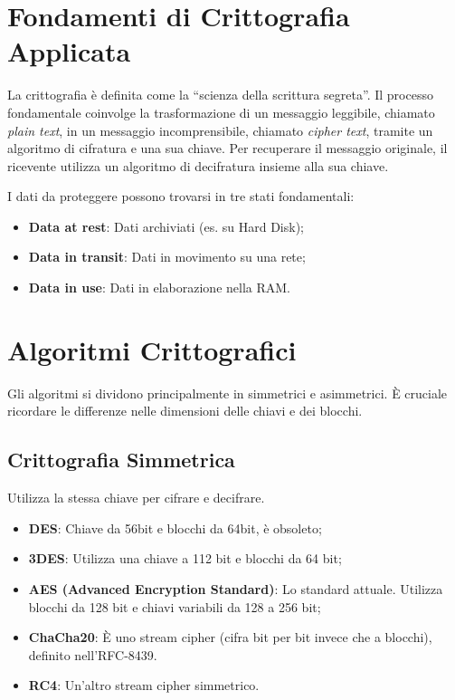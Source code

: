 %
%
\section{Fondamenti di Crittografia Applicata}
La crittografia è definita come la ``scienza della scrittura segreta''. Il processo fondamentale coinvolge la trasformazione di un messaggio leggibile, chiamato \emph{plain text}, in un messaggio incomprensibile, chiamato \emph{cipher text}, tramite un algoritmo di cifratura e una sua chiave. Per recuperare il messaggio originale, il ricevente utilizza un algoritmo di decifratura insieme alla sua chiave.

I dati da proteggere possono trovarsi in tre stati fondamentali:
\begin{itemize}
    \item \textbf{Data at rest}: Dati archiviati (es. su Hard Disk);
    \item \textbf{Data in transit}: Dati in movimento su una rete;
    \item \textbf{Data in use}: Dati in elaborazione nella RAM.
\end{itemize}

%
\section{Algoritmi Crittografici}
Gli algoritmi si dividono principalmente in simmetrici e asimmetrici. È cruciale ricordare le differenze nelle dimensioni delle chiavi e dei blocchi.
%
\subsection{Crittografia Simmetrica}
Utilizza la stessa chiave per cifrare e decifrare.
\begin{itemize}
    \item \textbf{DES}: Chiave da 56bit e blocchi da 64bit, è obsoleto;
    \item \textbf{3DES}: Utilizza una chiave a 112 bit e blocchi da 64 bit;
    \item \textbf{AES (Advanced Encryption Standard)}: Lo standard attuale. Utilizza blocchi da 128 bit e chiavi variabili da 128 a 256 bit;
    \item \textbf{ChaCha20}: È uno stream cipher (cifra bit per bit invece che a blocchi), definito nell'RFC-8439.
    \item \textbf{RC4}: Un'altro stream cipher simmetrico.
\end{itemize}

